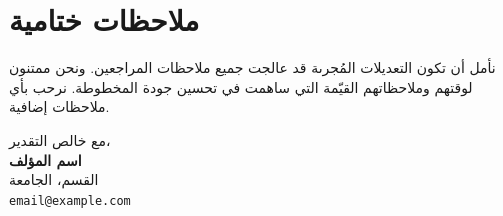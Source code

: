 \documentclass[11pt,a4paper]{article}
\begin{document}
\section{ملاحظات ختامية}

نأمل أن تكون التعديلات المُجرىة قد عالجت جميع ملاحظات المراجعين. ونحن ممتنون لوقتهم وملاحظاتهم القيّمة التي ساهمت في تحسين جودة المخطوطة. نرحب بأي ملاحظات إضافية.

\vspace{1.5em}

\noindent
مع خالص التقدير،\\[1em]
\textbf{اسم المؤلف}\\
القسم، الجامعة\\
\texttt{email@example.com}
\end{document}

